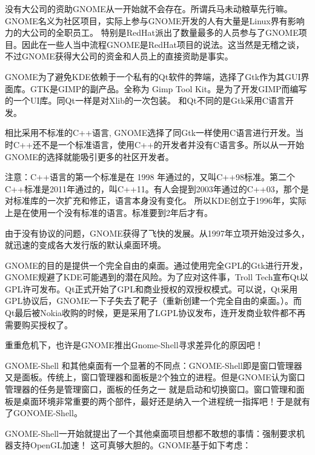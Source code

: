 没有大公司的资助GNOME从一开始就不会存在。所谓兵马未动粮草先行嘛。GNOME名义为社区项目，实际上参与GNOME开发的人有大量是Linux界有影响力的大公司的全职员工。
特别是RedHat派出了数量最多的人员参与了GNOME项目。因此在一些人当中流程GNOME是RedHat项目的说法。这当然是无稽之谈，不过GNOME获得大公司的资金和人员上的直接资助是事实。

GNOME为了避免KDE依赖于一个私有的Qt软件的弊端，选择了Gtk作为其GUI界面库。GTK是GIMP的副产品。全称为 Gimp Tool Kit。是为了开发GIMP而编写的一个UI库。同Qt一样是对Xlib的一次包装。
和Qt不同的是Gtk采用C语言开发。

相比采用不标准的C++语言, GNOME选择了同Gtk一样使用C语言进行开发。当时C++还不是一个标准语言，使用C++的开发者并没有C语言多。所以从一开始GNOME的选择就能吸引更多的社区开发者。

\begin{notice}
注意：C++语言的第一个标准是在 1998 年通过的，又叫C++98标准。第二个C++标准是2011年通过的，叫C++11。有人会提到2003年通过的C++03，那个是对标准库的一次扩充和修正，语言本身没有变化。
所以KDE创立于1996年，实际上是在使用一个没有标准的语言。标准要到2年后才有。
\end{notice}

由于没有协议的问题，GNOME获得了飞快的发展。从1997年立项开始没过多久，就迅速的变成各大发行版的默认桌面环境。

GNOME的目的是提供一个完全自由的桌面。通过使用完全GPL的Gtk进行开发，GNOME规避了KDE可能遇到的潜在风险。为了应对这件事，Troll Tech宣布Qt以GPL许可发布。Qt正式开始了GPL和商业授权的双授权模式。可以说，Qt采用GPL协议后，GNOME一下子失去了靶子（重新创建一个完全自由的桌面。）。而Qt最后被Nokia收购的时候，更是采用了LGPL协议发布，连开发商业软件都不再需要购买授权了。

重重危机下，也许是GNOME推出Gnome-Shell寻求差异化的原因吧！

GNOME-Shell 和其他桌面有一个显著的不同点：GNOME-Shell即是窗口管理器又是面板。传统上，窗口管理器和面板是2个独立的进程。但是GNOME认为窗口管理器的任务是管理窗口，面板的任务之一
就是启动和切换窗口。窗口管理和面板是桌面环境非常重要的两个部件，最好还是纳入一个进程统一指挥吧！于是就有了GONOME-Shell。

GNOME-Shell一开始就提出了一个其他桌面项目想都不敢想的事情：强制要求机器支持OpenGL加速！ 这可真够大胆的。GNOME基于如下考虑：

